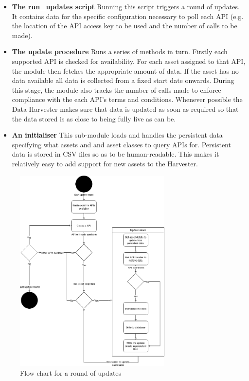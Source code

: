 \documentclass[main.tex]{subfiles}
\begin{document}
\begin{itemize}
    \item \textbf{The run\_updates script} Running this script triggers a round of updates. It contains data for the specific configuration necessary to poll each API (e.g. the location of the API access key to be used and the number of calls to be made).
    \item \textbf{The update procedure} Runs a series of methods in turn. Firstly each supported API is checked for availability. For each asset assigned to that API, the module then fetches the appropriate amount of data. If the asset has no data available all data is collected from a fixed start date onwards. During this stage, the module also tracks the number of calls made to enforce compliance with the each API's terms and conditions. Whenever possible the Data Harvester makes sure that data is updated as soon as required so that the data stored is as close to being fully live as can be.
    \item \textbf{An initialiser} This sub-module loads and handles the persistent data specifying what assets and and asset classes to query APIs for. Persistent data is stored in CSV files so as to be human-readable. This makes it relatively easy to add support for new assets to the Harvester.
\end{itemize}

\begin{figure}[H]
    \centering
    \includegraphics[width=0.7\textwidth]{04Design/04Pictures/update_mechanism_flow_chart.png}
    \caption{Flow chart for a round of updates\cite{TR}}
\end{figure}
\end{document}
